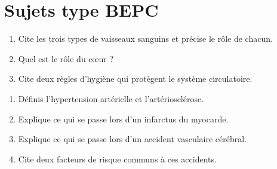 \section{Sujets type BEPC}

\begin{enumerate}[label=\arabic*)]
\item Cite les trois types de vaisseaux sanguins et précise le rôle de chacun.
\item Quel est le rôle du cœur ?
\item Cite deux règles d'hygiène qui protègent le système circulatoire.
\end{enumerate}

\begin{enumerate}[label=\arabic*)]
\item Définis l'hypertension artérielle et l'artériosclérose.
\item Explique ce qui se passe lors d'un infarctus du myocarde.
\item Explique ce qui se passe lors d'un accident vasculaire cérébral.
\item Cite deux facteurs de risque communs à ces accidents.
\end{enumerate}

